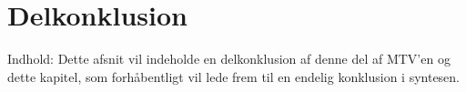 \section{Delkonklusion}
Indhold: Dette afsnit vil indeholde en delkonklusion af denne del af MTV'en og dette kapitel, som forhåbentligt vil lede frem til en endelig konklusion i syntesen. 